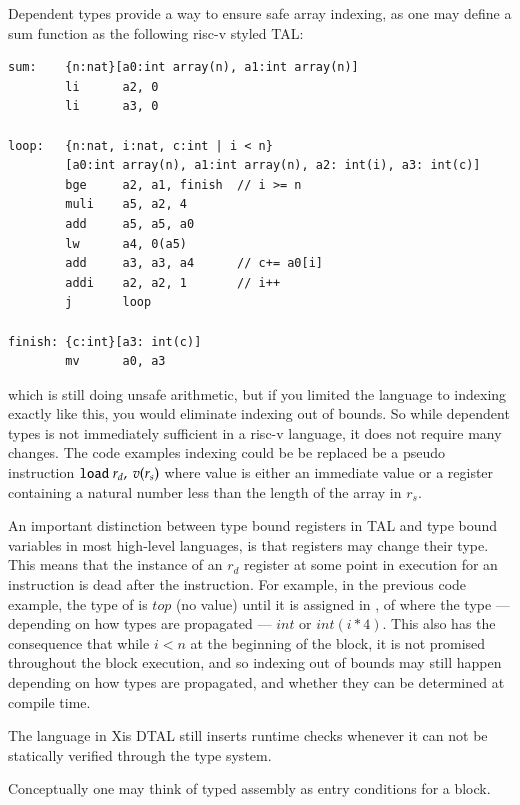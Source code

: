 Dependent types provide a way to ensure safe array indexing, as one may define
a sum function as the following risc-v styled TAL:
\begin{lstlisting}
sum:    {n:nat}[a0:int array(n), a1:int array(n)]
        li      a2, 0
        li      a3, 0

loop:   {n:nat, i:nat, c:int | i < n}
        [a0:int array(n), a1:int array(n), a2: int(i), a3: int(c)]
        bge     a2, a1, finish  // i >= n
        muli    a5, a2, 4
        add     a5, a5, a0
        lw      a4, 0(a5)
        add     a3, a3, a4      // c+= a0[i]
        addi    a2, a2, 1       // i++
        j       loop

finish: {c:int}[a3: int(c)]
        mv      a0, a3
\end{lstlisting}
which is still doing unsafe arithmetic, but if you limited the language to
indexing exactly like this, you would eliminate indexing out of bounds.
So while dependent types is not immediately sufficient in a risc-v language, it
does not require many changes.
The code examples indexing could be be replaced be a pseudo instruction $\texttt{load}\
r_d,\ v(r_s)$ where value is either an immediate value or a register containing
a natural number less than the length of the array in $r_s$.

An important distinction between type bound registers  in TAL and type bound
variables in most high-level languages, is that registers may change their
type.
This means that the instance of an $r_d$ register at some point in execution
for an instruction is dead after the instruction.
For example, in the previous code example, the type of  is $top$ (no
value) until it is assigned in \var{muli}, of where the type --- depending on
how types are propagated --- $int$ or $int(i * 4)$. This also has the
consequence that while $i < n$ at the beginning of the block, it is not
promised throughout the block execution, and so indexing out of bounds may
still happen depending on how types are propagated, and whether they can be
determined at compile time.

The language in Xis DTAL still inserts runtime checks whenever it can not be
statically verified through the type system.

Conceptually one may think of typed assembly as entry conditions for a block.





